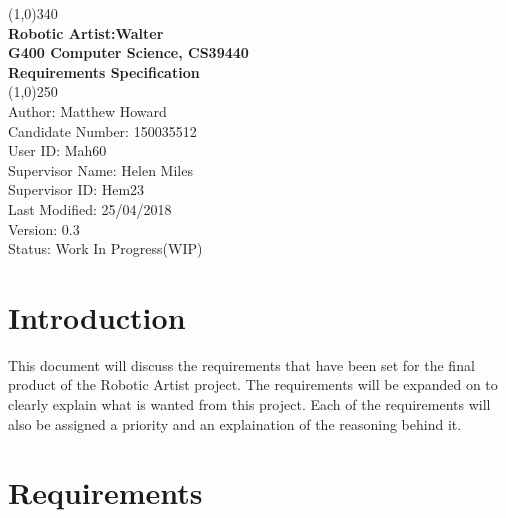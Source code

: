 \documentclass{article}
\begin{document}

    \begin{titlepage}

        \begin{center}

        \line(1,0){340}\\ 


        \large{\bfseries Robotic Artist:Walter} \\

        \large {\bfseries G400 Computer Science, CS39440 }\\
        
        \large {\bfseries Requirements Specification}\\


         \line(1,0){250}\\

         \textsf {Author: Matthew Howard \\
          Candidate Number: 150035512\\
          User ID: Mah60 \\
          Supervisor Name: Helen Miles \\
          Supervisor ID: Hem23\\
          Last Modified: 25/04/2018 \\
          Version: 0.3\\
          Status: Work In Progress(WIP)} \\

        \end{center}        

    \end{titlepage}
  
    \clearpage

     \tableofcontents
     
     \clearpage

    \section{Introduction}

This document will discuss the requirements that have been set for the final product of the Robotic Artist project. The requirements will be expanded on to clearly explain what is wanted from this project. Each of the requirements will also be assigned a priority and an explaination of the reasoning behind it.

    \section{Requirements}
    
\end{document}
